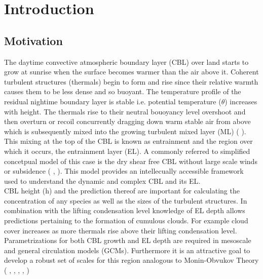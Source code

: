 
\chapter{Introduction} 
\label{ch:Introduction}
\setlength{\parindent}{0cm}

\section{Motivation}
\label{sec:Mot}

The daytime convective atmospheric boundary layer (\acs{CBL}) over land starts to grow at sunrise when the surface becomes warmer than the air above it.  Coherent turbulent structures (thermals) begin to form and rise since their relative warmth causes them to be less dense and so buoyant.  The temperature profile of the residual nightime boundary layer is stable i.e. potential temperature ($\theta$) increases with height.  The thermals rise to their neutral bouoyancy level overshoot and then overturn or recoil concurrently dragging down warm stable air from above which is subsequently mixed into the growing turbulent mixed layer (\acs{ML}) (\citeauthor{Stull-BLMetIntro} \citeyear{Stull-BLMetIntro}).  This mixing at the top of the \acs{CBL} is known as entrainment and the region over which it occurs, the entrainment layer (\acs{EL}). A commonly referred to simplified concetpual model of this case is the dry shear free \acs{CBL} without large scale winds or subsidence (\citeauthor{SullMoengStev} \citeyear{SullMoengStev}, \citeauthor{FedConzMir04} \citeyear{FedConzMir04} \citeauthor{BrooksFowler2} \citeyear{BrooksFowler2}). This model provides an intellecually accessible framework used to understand the dynamic and complex \acs{CBL} and its \acs{EL}.\\

\acs{CBL} height (h) and the prediction thereof are important for calculating the concentration of any species as well as the sizes of the turbulent structures.  In combination with the lifting condensation level knowledge of \acs{EL} depth allows predictions pertaining to the formation of cumulous clouds.  For example cloud cover increases as more thermals rise above their lifting condensation level.  Parametrizations for both \acs{CBL} growth and \acs{EL} depth are required in mesoscale and general circulation models (\acs{GCM}s).  Furthermore it is an attractive goal to develop a robust set of scales for this region analogous to Monin-Obvukov Theory (\citeauthor{Stull-BLMetIntro} \citeyear{Stull-BLMetIntro}, \citeauthor{Traum11} \citeyear{Traum11}, \citeauthor{SteynBaldHoff} \citeyear{SteynBaldHoff}, \citeauthor{StullNelEl} \citeyear{StullNelEl}, \citeauthor{Sorbjan} \citeyear{Sorbjan})\\

